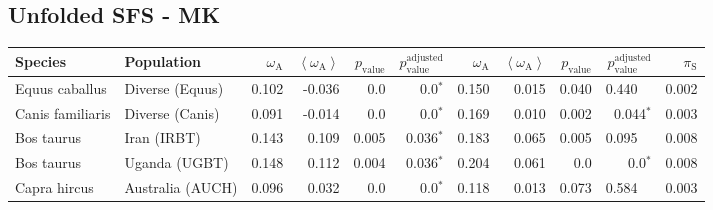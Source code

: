 \subsection{Unfolded SFS - MK} 
\begin{center}
\begin{adjustbox}{width = 1\textwidth}
\begin{tabular}{|l|l|r|r|r|r|r|r|r|r|r|}
\toprule
             Species &                      Population & $\omega_{\mathrm{A}}$ & $\left< \omega_{\mathrm{A}} \right>$ & $p_{\mathrm{value}}$ & $p_{\mathrm{value}}^{\mathrm{adjusted}}$ & $\omega_{\mathrm{A}}$ & $\left< \omega_{\mathrm{A}} \right>$ & $p_{\mathrm{value}}$ & $p_{\mathrm{value}}^{\mathrm{adjusted}}$ & $\pi_{\textrm{S}}$ \\
\midrule
      Equus caballus &                 Diverse (Equus) &                 0.102 &                               -0.036 &                  0.0 &                             0.0$\bm{^*}$ &                 0.150 &                                0.015 &                0.040 &                                  0.440~~ &              0.002 \\
    Canis familiaris &                 Diverse (Canis) &                 0.091 &                               -0.014 &                  0.0 &                             0.0$\bm{^*}$ &                 0.169 &                                0.010 &                0.002 &                           0.044$\bm{^*}$ &              0.003 \\
          Bos taurus &                     Iran (IRBT) &                 0.143 &                                0.109 &                0.005 &                           0.036$\bm{^*}$ &                 0.183 &                                0.065 &                0.005 &                                  0.095~~ &              0.008 \\
          Bos taurus &                   Uganda (UGBT) &                 0.148 &                                0.112 &                0.004 &                           0.036$\bm{^*}$ &                 0.204 &                                0.061 &                  0.0 &                             0.0$\bm{^*}$ &              0.008 \\
        Capra hircus &                Australia (AUCH) &                 0.096 &                                0.032 &                  0.0 &                             0.0$\bm{^*}$ &                 0.118 &                                0.013 &                0.073 &                                  0.584~~ &              0.003 \\

\end{tabular}
\end{adjustbox}
\end{center}
